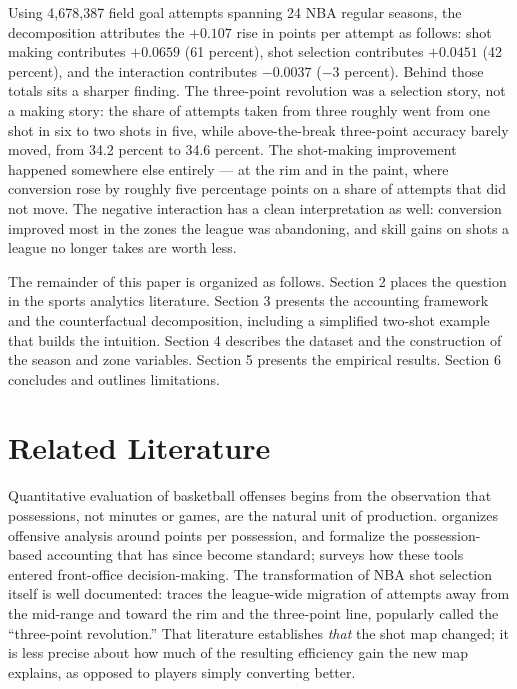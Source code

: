\documentclass[12pt]{article}
\begin{document}
Using 4,678,387 field goal attempts spanning 24 NBA regular seasons, the
decomposition attributes the $+0.107$ rise in points per attempt as follows:
shot making contributes $+0.0659$ (61 percent), shot selection contributes
$+0.0451$ (42 percent), and the interaction contributes $-0.0037$ ($-3$
percent). Behind those totals sits a sharper finding. The three-point
revolution was a selection story, not a making story: the share of attempts
taken from three roughly went from one shot in six to two shots in five,
while above-the-break three-point accuracy barely moved, from 34.2 percent to
34.6 percent. The shot-making improvement happened somewhere else entirely
--- at the rim and in the paint, where conversion rose by roughly five
percentage points on a share of attempts that did not move. The negative
interaction has a clean interpretation as well: conversion improved most in
the zones the league was abandoning, and skill gains on shots a league no
longer takes are worth less.

The remainder of this paper is organized as follows. Section 2 places the
question in the sports analytics literature. Section 3 presents the
accounting framework and the counterfactual decomposition, including a
simplified two-shot example that builds the intuition. Section 4 describes
the dataset and the construction of the season and zone variables. Section 5
presents the empirical results. Section 6 concludes and outlines limitations.

\section{Related Literature}

Quantitative evaluation of basketball offenses begins from the observation
that possessions, not minutes or games, are the natural unit of production.
\citet{oliver2004} organizes offensive analysis around points per possession,
and \citet{kubatko2007} formalize the possession-based accounting that has
since become standard; \citet{alamar2013} surveys how these tools entered
front-office decision-making. The transformation of NBA shot selection itself
is well documented: \citet{goldsberry2019} traces the league-wide migration of
attempts away from the mid-range and toward the rim and the three-point line,
popularly called the ``three-point revolution.'' That literature establishes
\emph{that} the shot map changed; it is less precise about how much of the
resulting efficiency gain the new map explains, as opposed to players simply
converting better.
\end{document}
